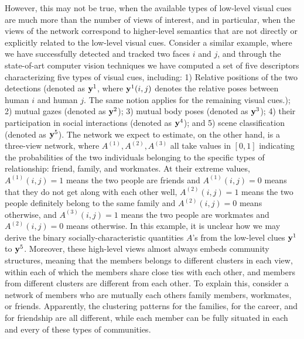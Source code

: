 However, this may not be true, when the available types of low-level visual cues are much more than the number of views of interest, and in particular, when the views of the network correspond to higher-level semantics that are not directly or explicitly related to the low-level visual cues. Consider a similar example, where we have successfully detected and tracked two faces $i$ and $j$, and through the state-of-art computer vision techniques we have computed a set of five descriptors characterizing five types of visual cues, including: 1) Relative positions of the two detections (denoted as ${\bf y}^1$, where ${\bf y}^1(i,j)$ denotes the relative poses between human $i$ and human $j$. The same notion applies for the remaining visual cues.); 2) mutual gazes (denoted as ${\bf y}^2$); 3) mutual body poses (denoted as ${\bf y}^3$); 4) their participation in social interactions (denoted as ${\bf y}^4$); and 5) scene classification (denoted as ${\bf y}^5$). The network we expect to estimate, on the other hand, is a three-view network, where $A^{(1)}, A^{(2)}, A^{(3)}$ all take values in $[0,1]$ indicating the probabilities of the two individuals belonging to the specific types of relationship: friend, family, and workmates. At their extreme values, $A^{(1)}(i,j)=1$ means the two people are friends and $A^{(1)}(i,j)=0$ means that they do not get along with each other well,  $A^{(2)}(i,j)=1$ means the two people definitely belong to the same family and $A^{(2)}(i,j)=0$ means otherwise, and $A^{(3)}(i,j)=1$ means the two people are workmates and $A^{(2)}(i,j)=0$ means otherwise. In this example, it is unclear how we may derive the binary socially-characteristic quantities $A$'s from the low-level clues ${\bf y}^1$ to ${\bf y}^5$.  Moreover, these high-level views almost always embeds community structures, meaning that the members belongs to different clusters in each view, within each of which the members share close ties with each other, and members from different clusters are different from each other. To explain this, consider a network of members who are mutually each others family members, workmates, or friends. Apparently, the clustering patterns for the families, for the career, and for friendship are all different, while each member can be fully situated in each and every of these types of communities.


